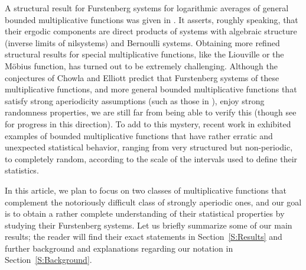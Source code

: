 \documentclass[11pt]{amsart}
\theoremstyle{definition}
\begin{document}
A structural result for Furstenberg systems for logarithmic averages  of general bounded multiplicative functions  was given   in \cite{FH18, FH21}. It asserts,  roughly speaking, that their ergodic components are direct products of systems with algebraic structure
(inverse limits of nilsystems) and Bernoulli systems.
Obtaining more refined structural results for special multiplicative functions, like the Liouville  or the M\"obius function, has turned out to be extremely challenging. Although the conjectures of  Chowla and Elliott  predict that  Furstenberg systems of these multiplicative functions, and more general bounded  multiplicative functions that satisfy strong aperiodicity assumptions (such as those in \cite[Equation~$(1.9)$]{MRT15}), enjoy strong randomness properties, we are still far from being able
to verify this (though see \cite{KMT23, MR15, MRT15, MRT20,MRT23,T16, Tao15,  TT18, TT19} for progress in this direction). To add to this mystery,  recent  work in \cite{GLR21}	
exhibited examples of bounded multiplicative functions that have
rather erratic and unexpected statistical behavior, ranging from very structured but non-periodic, to completely random, according to the scale of the intervals used to  define their statistics.


In this article, we plan to focus on two classes of multiplicative functions  that complement the notoriously difficult  class of strongly aperiodic ones, and  our goal is to obtain a rather complete understanding of their statistical properties by studying their Furstenberg systems. Let us briefly summarize some of our main results;  the reader will find their exact statements in Section~\ref{S:Results} and further background and explanations regarding our notation in Section~\ref{S:Background}.





 \smallskip
\end{document}

